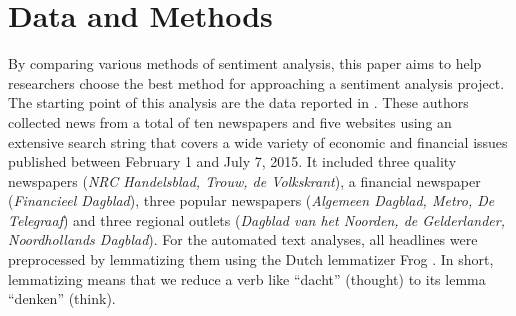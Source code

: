\section{Data and Methods}

\noindent By comparing various methods of sentiment analysis, 
this paper aims to help researchers choose the best method for approaching a sentiment analysis project.
The starting point of this analysis are the data reported in \cite{boukes2019}.
These authors collected news from a total of ten newspapers and five websites using an extensive search string that covers a wide variety of economic and financial issues published between February 1 and July 7, 2015. It included three quality newspapers (\textit{NRC Handelsblad, Trouw, de Volkskrant}), a financial newspaper (\textit{Financieel Dagblad}), three popular newspapers (\textit{Algemeen Dagblad, Metro, De Telegraaf}) and three regional outlets (\textit{Dagblad van het Noorden, de Gelderlander, Noordhollands Dagblad}). 
For the automated text analyses, all headlines were preprocessed by lemmatizing them using the Dutch lemmatizer Frog \citep{frog}.
In short, lemmatizing means that we reduce a verb like ``dacht'' (thought) to its lemma ``denken'' (think). 

